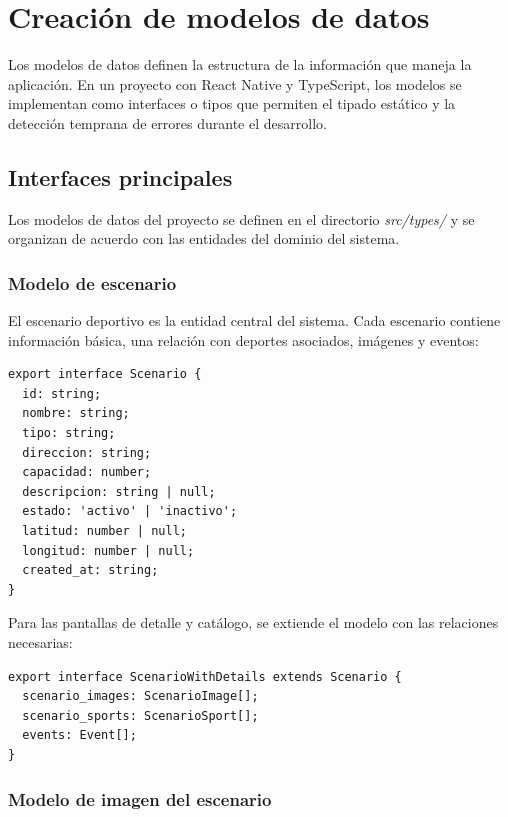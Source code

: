 
\section{Creaci\'on de modelos de datos}

Los modelos de datos definen la estructura de la informaci\'on que maneja la
aplicaci\'on. En un proyecto con React Native y TypeScript, los modelos se
implementan como interfaces o tipos que permiten el tipado est\'atico y la
detecci\'on temprana de errores durante el desarrollo.

\subsection{Interfaces principales}

Los modelos de datos del proyecto se definen en el directorio
\textit{src/types/} y se organizan de acuerdo con las entidades del dominio
del sistema.

\subsubsection{Modelo de escenario}

El escenario deportivo es la entidad central del sistema. Cada escenario
contiene informaci\'on b\'asica, una relaci\'on con deportes asociados, im\'agenes y
eventos:

\begin{lstlisting}
export interface Scenario {
  id: string;
  nombre: string;
  tipo: string;
  direccion: string;
  capacidad: number;
  descripcion: string | null;
  estado: 'activo' | 'inactivo';
  latitud: number | null;
  longitud: number | null;
  created_at: string;
}
\end{lstlisting}

Para las pantallas de detalle y cat\'alogo, se extiende el modelo con las
relaciones necesarias:

\begin{lstlisting}
export interface ScenarioWithDetails extends Scenario {
  scenario_images: ScenarioImage[];
  scenario_sports: ScenarioSport[];
  events: Event[];
}
\end{lstlisting}

\subsubsection{Modelo de imagen del escenario}

